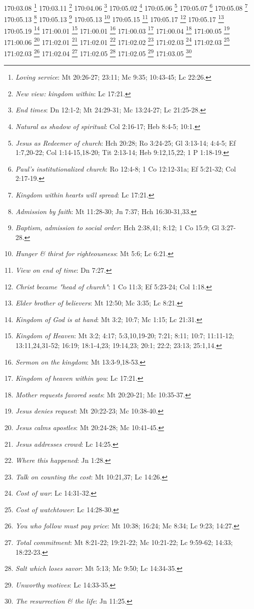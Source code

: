 170:03.08 \footnote{\textit{Loving service}: Mt 20:26-27; 23:11; Mc 9:35; 10:43-45; Lc 22:26.}
170:03.11 \footnote{\textit{New view: kingdom within}: Lc 17:21.}
170:04.06 \footnote{\textit{End times}: Dn 12:1-2; Mt 24:29-31; Mc 13:24-27; Lc 21:25-28.}
170:05.02 \footnote{\textit{Natural as shadow of spiritual}: Col 2:16-17; Heb 8:4-5; 10:1.}
170:05.06 \footnote{\textit{Jesus as Redeemer of church}: Hch 20:28; Ro 3:24-25; Gl 3:13-14; 4:4-5; Ef 1:7,20-22; Col 1:14-15,18-20; Tit 2:13-14; Heb 9:12,15,22; 1 P 1:18-19.}
170:05.07 \footnote{\textit{Paul's institutionalized church}: Ro 12:4-8; 1 Co 12:12-31a; Ef 5:21-32; Col 2:17-19.}
170:05.08 \footnote{\textit{Kingdom within hearts will spread}: Lc 17:21.}
170:05.13 \footnote{\textit{Admission by faith}: Mt 11:28-30; Jn 7:37; Hch 16:30-31,33.}
170:05.13 \footnote{\textit{Baptism, admission to social order}: Hch 2:38,41; 8:12; 1 Co 15:9; Gl 3:27-28.}
170:05.13 \footnote{\textit{Hunger & thirst for righteousness}: Mt 5:6; Lc 6:21.}
170:05.15 \footnote{\textit{View on end of time}: Dn 7:27.}
170:05.17 \footnote{\textit{Christ became "head of church"}: 1 Co 11:3; Ef 5:23-24; Col 1:18.}
170:05.17 \footnote{\textit{Elder brother of believers}: Mt 12:50; Mc 3:35; Lc 8:21.}
170:05.19 \footnote{\textit{Kingdom of God is at hand}: Mt 3:2; 10:7; Mc 1:15; Lc 21:31.}
171:00.01 \footnote{\textit{Kingdom of Heaven}: Mt 3:2; 4:17; 5:3,10,19-20; 7:21; 8:11; 10:7; 11:11-12; 13:11,24,31-52; 16:19; 18:1-4,23; 19:14,23; 20:1; 22:2; 23:13; 25:1,14.}
171:00.01 \footnote{\textit{Sermon on the kingdom}: Mt 13:3-9,18-53.}
171:00.03 \footnote{\textit{Kingdom of heaven within you}: Lc 17:21.}
171:00.04 \footnote{\textit{Mother requests favored seats}: Mt 20:20-21; Mc 10:35-37.}
171:00.05 \footnote{\textit{Jesus denies request}: Mt 20:22-23; Mc 10:38-40.}
171:00.06 \footnote{\textit{Jesus calms apostles}: Mt 20:24-28; Mc 10:41-45.}
171:02.01 \footnote{\textit{Jesus addresses crowd}: Lc 14:25.}
171:02.01 \footnote{\textit{Where this happened}: Jn 1:28.}
171:02.02 \footnote{\textit{Talk on counting the cost}: Mt 10:21,37; Lc 14:26.}
171:02.03 \footnote{\textit{Cost of war}: Lc 14:31-32.}
171:02.03 \footnote{\textit{Cost of watchtower}: Lc 14:28-30.}
171:02.03 \footnote{\textit{You who follow must pay price}: Mt 10:38; 16:24; Mc 8:34; Lc 9:23; 14:27.}
171:02.04 \footnote{\textit{Total commitment}: Mt 8:21-22; 19:21-22; Mc 10:21-22; Lc 9:59-62; 14:33; 18:22-23.}
171:02.05 \footnote{\textit{Salt which loses savor}: Mt 5:13; Mc 9:50; Lc 14:34-35.}
171:02.05 \footnote{\textit{Unworthy motives}: Lc 14:33-35.}
171:03.05 \footnote{\textit{The resurrection & the life}: Jn 11:25.}
